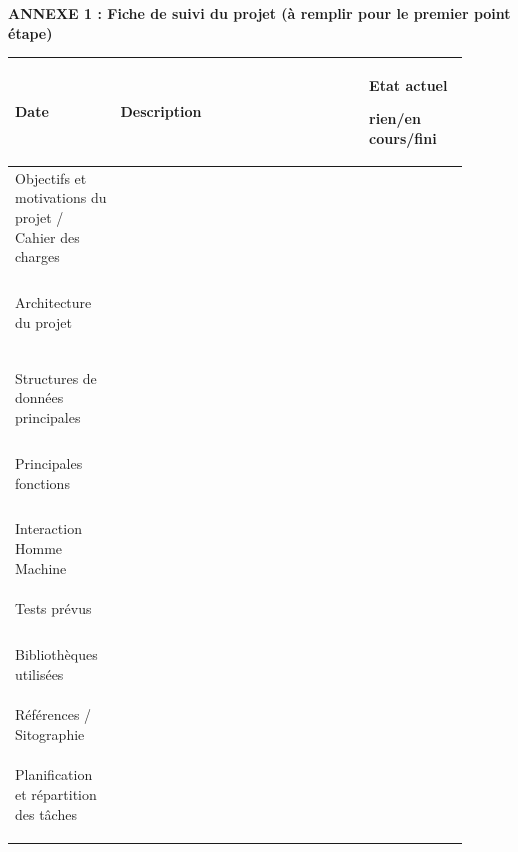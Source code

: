 \documentclass[a4paper, french, 12pt]{article}  %
\newcounter{act}
\begin{document}
\begin{center}

{\large \textbf{ANNEXE 1 : Fiche de suivi du projet  (à remplir pour le premier point étape)}}

\vspace{0.5 cm}
{\small

\begin{tabular}{|p{0.2\linewidth}|>{\centering \arraybackslash}p{0.5\linewidth}|>{\centering \arraybackslash}p{0.2\linewidth}|}
\hline
\textbf{Date} & \textbf{Description} & \textbf{Etat actuel} \par {\scriptsize \textbf{rien/en cours/fini}} \\
\hline
Objectifs et motivations du projet / Cahier des charges &  &  \\
 & & \\
  & & \\
   & & \\
    & & \\
  \hline
 Architecture du projet &  &  \\
& & \\
   & & \\
   & & \\
   & & \\
    & & \\
     & & \\
  \hline
Structures de données principales   & & \\
   & & \\
   & & \\
      & & \\
   & & \\
  \hline
Principales fonctions & & \\
   & & \\
   & & \\
   & & \\
    & & \\
       \hline
 Interaction Homme Machine    & & \\
   & & \\
   & & \\
    & & \\
   \hline
Tests prévus & & \\
   & & \\
   & & \\
   & & \\
    & & \\
       \hline
Bibliothèques utilisées    & & \\
   & & \\
   & & \\
    & & \\
    \hline
Références / Sitographie &  &  \\
& & \\
   & & \\
    & & \\
  \hline
Planification et répartition des tâches &  &  \\
& & \\
   & & \\
    & & \\
  \hline
\end{tabular}}

\end{center}



 
\end{document}

